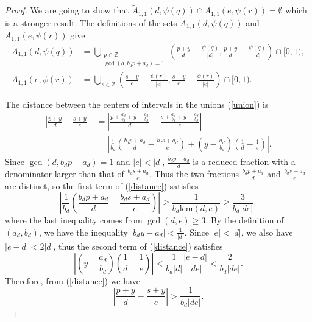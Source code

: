 \documentclass[10pt,a4paper]{amsart}
\begin{document}
\begin{proof}
    We are going to show that $\tilde A_{1,1} (d, \psi(q)) \cap A_{1,1}(e, \psi(r)) = \emptyset$ which is a stronger result. The definitions of the sets $\tilde A_{1,1}(d, \psi(q))$ and $A_{1,1}(e, \psi(r))$ give
    \begin{equation}\label{union}
        \begin{aligned}
            \tilde A_{1,1}(d, \psi(q)) &= \bigcup_{\substack{p \in \mathbb{Z}\\ \gcd(d, b_d p + a_d)=1}} \left(\frac{p+y}{d} -\frac{\psi(q)}{|d|}, \frac{p+y}{d} + \frac{\psi(q)}{|d|} \right) \cap [0,1),\\
            A_{1,1}(e, \psi(r)) &= \bigcup_{s \in \mathbb{Z}} \left(\frac{s+y}{e} - \frac{\psi(r)}{|e|}, \frac{s+y}{e} + \frac{\psi(r)}{|e|} \right) \cap [0,1).
        \end{aligned}
    \end{equation}
    
    The distance between the centers of intervals in the unions (\ref{union}) is
    \begin{align}\label{distance}
        \left| \frac{p+y}{d} - \frac{s+y}{e} \right| &= \left| \frac{p+ \frac{a_d}{b_d} +y -\frac{a_d}{b_d}}{d} - \frac{s+ \frac{a_d}{b_d} + y - \frac{a_d}{b_d}}{e} \right| \nonumber \\
        &= \left| \frac{1}{b_d} \left(\frac{b_d p + a_d}{d} - \frac{b_d s + a_d}{e} \right) + \left(y - \frac{a_d}{b_d} \right) \left(\frac{1}{d} - \frac{1}{e} \right)\right|.
    \end{align}
    Since $\gcd(d, b_d p+a_d) = 1$ and $|e| < |d|$, $\frac{b_d p+a_d}{d}$ is a reduced fraction with a denominator larger than that of $\frac{b_d s+a_d}{e}.$ Thus the two fractions $\frac{b_d p+a_d}{d}$ and $\frac{b_d s+a_d}{e}$ are distinct, so the first term of (\ref{distance}) satisfies
    $$\left| \frac{1}{b_d} \left(\frac{b_d p + a_d}{d} - \frac{b_d s + a_d}{e} \right) \right| \geq \frac{1}{b_d \text{lcm}(d,e)} \geq \frac{3}{b_d |de|},$$
    where the last inequality comes from $\gcd(d,e) \geq 3$. By the definition of $(a_d,b_d)$, we have the inequality $|b_d y - a_d| < \frac{1}{|d|}$. Since $|e|<|d|$, we also have $|e-d|<2|d|$, thus the second term of (\ref{distance}) satisfies
    $$\left|\left(y - \frac{a_d}{b_d} \right) \left(\frac{1}{d} - \frac{1}{e} \right)\right| < \frac{1}{b_d|d|} \frac{|e-d|}{|de|} < \frac{2}{b_d |de|}.$$
    Therefore, from (\ref{distance}) we have
    $$\left| \frac{p+y}{d} - \frac{s+y}{e} \right| > \frac{1}{b_d |de|}.$$


\end{proof}
\end{document}
